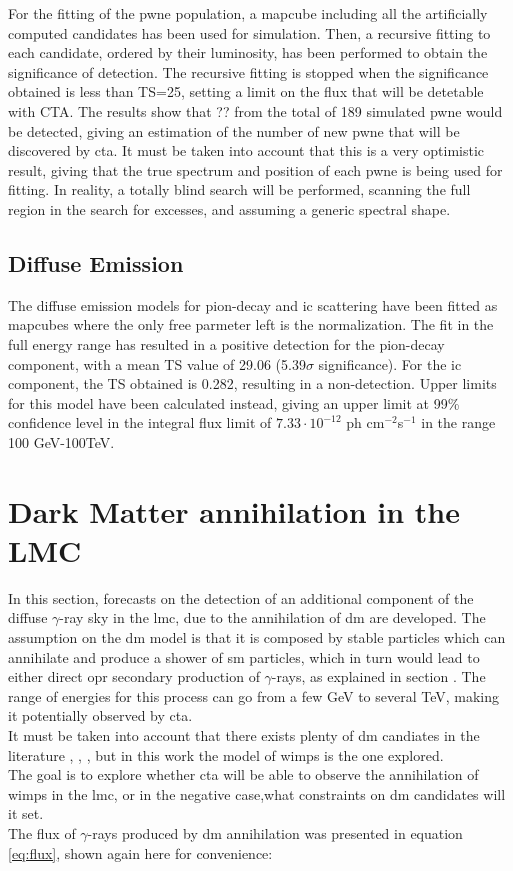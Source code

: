 \documentclass[main.tex]{subfiles}
\begin{document}
For the fitting of the \gls{pwne} population, a mapcube including all the artificially computed candidates has been used for simulation. Then, a recursive fitting to each candidate, ordered by their luminosity, has been performed to obtain the significance of detection. The recursive fitting is stopped when the significance obtained is less than TS=25, setting a limit on the flux that will be detetable with CTA. The results show that ?? from the total of 189 simulated \gls{pwne} would be detected, giving an estimation of the number of new \gls{pwne} that will be discovered by \gls{cta}. It must be taken into account that this is a very optimistic result, giving that the true spectrum and position of each \gls{pwne} is being used for fitting. In reality, a totally blind search will be performed, scanning the full region in the search for excesses, and assuming a generic spectral shape.

\subsection{Diffuse Emission}

The diffuse emission models for pion-decay and \gls{ic} scattering have been fitted as mapcubes where the only free parmeter left is the normalization. The fit in the full energy range has resulted in a positive detection for the pion-decay component, with a mean TS value of 29.06 (5.39$\sigma$ significance). For the \gls{ic} component, the TS obtained is 0.282, resulting in a non-detection. Upper limits for this model have been calculated instead, giving an upper limit at 99\% confidence level in the integral flux limit of $7.33\cdot10^{-12}$ ph cm$^{-2}$s$^{-1}$ in the range 100 GeV-100TeV.   


\section{Dark Matter annihilation in the LMC} \label{sec:dminlmc}

In this section, forecasts on the detection of an additional component of the diffuse $\gamma$-ray sky in the \gls{lmc}, due to the annihilation of \gls{dm} are developed. The assumption on the \gls{dm} model is that it is composed by stable particles which can annihilate and produce a shower of \gls{sm} particles, which in turn would lead to either direct opr secondary production of $\gamma$-rays, as explained in section \label{sec:DM}. The range of energies for this process can go from a few GeV to several TeV, making it potentially observed by \gls{cta}.\\
It must be taken into account that there exists plenty of \gls{dm} candiates in the literature \cite{2004DMcandidates}, \cite{2005DMcandidates}, \cite{2009DMcandidates}, but in this work the model of \glspl{wimp} is the one explored.\\
The goal is to explore whether \gls{cta} will be able to observe the annihilation of \glspl{wimp} in the \gls{lmc}, or in the negative case,what constraints on \gls{dm} candidates will it set.\\
The flux of $\gamma$-rays produced by \gls{dm} annihilation was presented in equation \ref{eq:flux}, shown again here for convenience:
\end{document}
